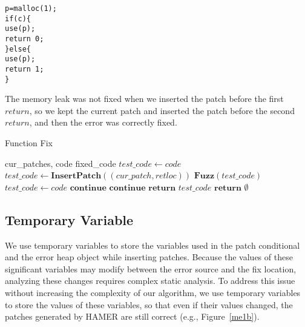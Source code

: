 \documentclass[a4paper,11pt,oneside,openany]{book}
\begin{document}
\begin{minipage}{\textwidth}
    \vspace{0.2cm}
    \hspace{0.3cm}\verb|p=malloc(1);|\\\hspace{0.3cm}\verb|if(c){|\\\hspace{0.6cm}\verb|use(p);|\\\hspace{0.6cm}\verb|return 0;|\\\hspace{0.3cm}\verb|}else{|\\\hspace{0.6cm}\verb|use(p);|\\\hspace{0.6cm}\verb|return 1;|\\\hspace{0.3cm}\verb|}|
    \vspace{0.2cm}
\end{minipage}
The memory leak was not fixed when we inserted the patch before the first $return$, so we kept the current patch and inserted the patch before the second $return$, and then the error was correctly fixed.



 \begin{algorithm}[h]
 \caption{Function Fix}
 \label{funcfix}
 \begin{algorithmic}[1]
 \renewcommand{\algorithmicrequire}{\textbf{Input:}}
 \renewcommand{\algorithmicensure}{\textbf{Output:}}
 \REQUIRE cur\_patches, code
 \ENSURE  fixed\_code
  \STATE $test\_code \gets code$
    \STATE $test\_code \gets \textbf{InsertPatch}((cur\_patch,retloc))$
    \STATE $\textbf{Fuzz}(test\_code)$
     \STATE $test\_code \gets code$
     \STATE $\textbf{continue}$
     \STATE $\textbf{continue}$
    \ELSE 
     \STATE $\textbf{return}$ $test\_code$
    \ENDIF
   \ENDFOR
  \ENDFOR
  \STATE $\textbf{return}$ $\emptyset$
 \end{algorithmic} 
 \end{algorithm}

\subsection{Temporary Variable}
We use temporary variables to store the variables used in the patch conditional and the error heap object while inserting patches. Because the values of these significant variables may modify between the error source and the fix location, analyzing these changes requires complex static analysis. To address this issue without increasing the complexity of our algorithm, we use temporary variables to store the values of these variables, so that even if their values changed, the patches generated by HAMER are still correct (e.g., Figure~\ref{me1b}).
\end{document}

